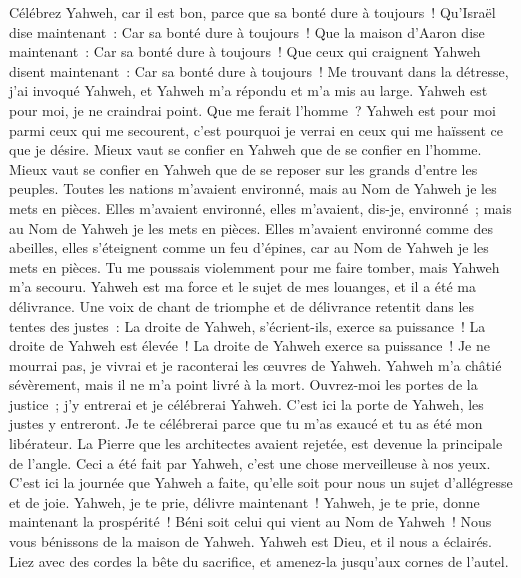 \begin{multicols}{2}
\VerseOne{}Célébrez Yahweh, car il est bon, parce que sa bonté dure à toujours~!
Qu'Israël dise maintenant~: Car sa bonté dure à toujours~!
Que la maison d'Aaron dise maintenant~: Car sa bonté dure à toujours~!
Que ceux qui craignent Yahweh disent maintenant~: Car sa bonté dure à toujours~!
Me trouvant dans la détresse, j'ai invoqué Yahweh, et Yahweh m'a répondu et m'a mis au large.
Yahweh est pour moi, je ne craindrai point. Que me ferait l'homme~?
Yahweh est pour moi parmi ceux qui me secourent, c'est pourquoi je verrai en ceux qui me haïssent ce que je désire.
Mieux vaut se confier en Yahweh que de se confier en l'homme.
Mieux vaut se confier en Yahweh que de se reposer sur les grands d'entre les peuples.
Toutes les nations m'avaient environné, mais au Nom de Yahweh je les mets en pièces.
Elles m'avaient environné, elles m'avaient, dis-je, environné~; mais au Nom de Yahweh je les mets en pièces.
Elles m'avaient environné comme des abeilles, elles s'éteignent comme un feu d'épines, car au Nom de Yahweh je les mets en pièces.
Tu me poussais violemment pour me faire tomber, mais Yahweh m'a secouru.
Yahweh est ma force et le sujet de mes louanges, et il a été ma délivrance.
Une voix de chant de triomphe et de délivrance retentit dans les tentes des justes~: La droite de Yahweh, s'écrient-ils, exerce sa puissance~!
La droite de Yahweh est élevée~! La droite de Yahweh exerce sa puissance~!
Je ne mourrai pas, je vivrai et je raconterai les œuvres de Yahweh.
Yahweh m'a châtié sévèrement, mais il ne m'a point livré à la mort.
Ouvrez-moi les portes de la justice~; j'y entrerai et je célébrerai Yahweh.
C'est ici la porte de Yahweh, les justes y entreront.
Je te célébrerai parce que tu m'as exaucé et tu as été mon libérateur.
La Pierre que les architectes avaient rejetée, est devenue la principale de l'angle.
Ceci a été fait par Yahweh, c'est une chose merveilleuse à nos yeux.
C'est ici la journée que Yahweh a faite, qu'elle soit pour nous un sujet d'allégresse et de joie.
Yahweh, je te prie, délivre maintenant~! Yahweh, je te prie, donne maintenant la prospérité~!
Béni soit celui qui vient au Nom de Yahweh~! Nous vous bénissons de la maison de Yahweh.
Yahweh est Dieu, et il nous a éclairés. Liez avec des cordes la bête du sacrifice, et amenez-la jusqu'aux cornes de l'autel.

\end{multicols}
